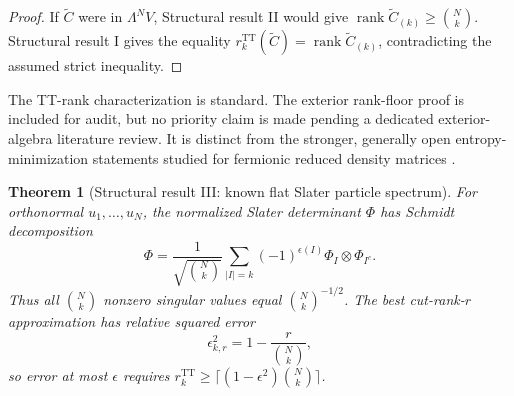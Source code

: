 \documentclass[aps,pra,reprint,superscriptaddress,nofootinbib,longbibliography,showkeys]{revtex4-2}
\newtheorem{theorem}{Theorem}[section]
\theoremstyle{definition}
\newcommand{\TT}{\mathrm{TT}}
\newcommand{\rank}{\operatorname{rank}}
\begin{document}
\begin{proof}
If $\widetilde C$ were in $\Lambda^N V$, Structural result II would give
$\rank\widetilde C_{(k)}\ge\binom Nk$.  Structural result I gives the equality
$r_k^{\TT}(\widetilde C)=\rank\widetilde C_{(k)}$, contradicting the assumed
strict inequality.
\end{proof}

The TT-rank characterization is standard.  The exterior rank-floor proof is
included for audit, but no priority claim is made pending a dedicated exterior-
algebra literature review.  It is distinct from the stronger, generally open
entropy-minimization statements studied for fermionic reduced density
matrices \cite{CarlenLiebReuvers2016FermionicEntropy,
LiWaintal2026FirstQuantization}.

\begin{theorem}[Structural result III: known flat Slater particle spectrum]
For orthonormal $u_1,\ldots,u_N$, the normalized Slater determinant $\Phi$
has Schmidt decomposition
\[
 \Phi=\frac{1}{\sqrt{\binom{N}{k}}}
 \sum_{|I|=k}(-1)^{\epsilon(I)}\Phi_I\otimes\Phi_{I^c}.
\]
Thus all $\binom{N}{k}$ nonzero singular values equal
$\binom{N}{k}^{-1/2}$.  The best cut-rank-$r$ approximation has relative
squared error
\[
 \epsilon_{k,r}^2=1-\frac{r}{\binom{N}{k}},
\]
so error at most $\epsilon$ requires
$r_k^{\TT}\ge\lceil(1-\epsilon^2)\binom{N}{k}\rceil$.
\label{thm:r2}
\end{theorem}
\end{document}
